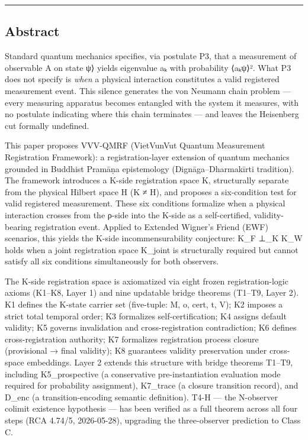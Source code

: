 \documentclass[
  11pt,
]{article}
\begin{document}
\begin{center}\rule{0.5\linewidth}{0.5pt}\end{center}

\subsection{Abstract}\label{abstract}

Standard quantum mechanics specifies, via postulate P3, that a
measurement of observable A on state \textbar ψ⟩ yields eigenvalue aₖ
with probability \textbar⟨aₖ\textbar ψ⟩\textbar². What P3 does not
specify is \emph{when} a physical interaction constitutes a valid
registered measurement event. This silence generates the von Neumann
chain problem --- every measuring apparatus becomes entangled with the
system it measures, with no postulate indicating where this chain
terminates --- and leaves the Heisenberg cut formally undefined.

This paper proposes VVV-QMRF (VietVunVut Quantum Measurement
Registration Framework): a registration-layer extension of quantum
mechanics grounded in Buddhist Pramāṇa epistemology
(Dignāga--Dharmakīrti tradition). The framework introduces a K-side
registration space K, structurally separate from the physical Hilbert
space H (K ≠ H), and proposes a six-condition test for valid registered
measurement. These six conditions formalize when a physical interaction
crosses from the ρ-side into the K-side as a self-certified,
validity-bearing registration event. Applied to Extended Wigner's Friend
(EWF) scenarios, this yields the K-side incommensurability conjecture:
K\_F ⊥\_K K\_W holds when a joint registration space K\_joint is
structurally required but cannot satisfy all six conditions
simultaneously for both observers.

The K-side registration space is axiomatized via eight frozen
registration-logic axioms (K1--K8, Layer 1) and nine updatable bridge
theorems (T1--T9, Layer 2). K1 defines the K-state carrier set
(five-tuple: M, o, cert, t, V); K2 imposes a strict total temporal
order; K3 formalizes self-certification; K4 assigns default validity; K5
governs invalidation and cross-registration contradiction; K6 defines
cross-registration authority; K7 formalizes registration process closure
(provisional → final validity); K8 guarantees validity preservation
under cross-space embeddings. Layer 2 extends this structure with bridge
theorems T1--T9, including K5\_prospective (a conservative
pre-instantiation evaluation mode required for probability assignment),
K7\_trace (a closure transition record), and D\_enc (a
transition-encoding semantic definition). T4-H --- the N-observer
colimit existence hypothesis --- has been verified as a full theorem
across all four steps (RCA 4.74/5, 2026-05-28), upgrading the
three-observer prediction to Class C.
\end{document}
